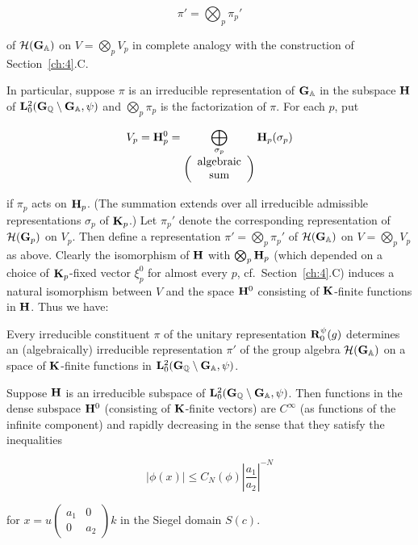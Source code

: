 \[
\pi' = \bigotimes_p \pi_p'
\]

of $\mathcal{H}(\mathbf{G}_{\mathbb{A}})$ on $V = \bigotimes_p V_p$ in complete analogy with the construction of Section~\ref{ch:4}.C.

In particular, suppose $\pi$ is an irreducible representation of $\mathbf{G}_{\mathbb{A}}$ in the subspace $\mathbf{H}$ of $\mathbf{L}_0^2(\mathbf{G}_{\mathbb{Q}} \setminus \mathbf{G}_{\mathbb{A}}, \psi)$ and $\bigotimes_p \pi_p$ is the factorization of $\pi$. For each $p$, put

\[
V_p = \mathbf{H}_p^0 = \bigoplus_{\substack{\sigma_p\\ \left(\begin{array}{c} \text{algebraic}\\ \text{sum} \end{array}\right)}} \mathbf{H}_p(\sigma_p)
\]

if $\pi_p$ acts on $\mathbf{H}_p$. (The summation extends over all irreducible admissible representations $\sigma_p$ of $\mathbf{K}_p$.) Let $\pi_p'$ denote the corresponding representation of $\mathcal{H}(\mathbf{G}_p)$ on $V_p$. Then define a representation $\pi' = \bigotimes_p \pi_p'$ of $\mathcal{H}(\mathbf{G}_{\mathbb{A}})$ on $V = \bigotimes_p V_p$ as above. Clearly the isomorphism of $\mathbf{H}$ with $\bigotimes_p \mathbf{H}_p$ (which depended on a choice of $\mathbf{K}_p$-fixed vector $\xi_p^0$ for almost every $p$, cf.\ Section~\ref{ch:4}.C) induces a natural isomorphism between $V$ and the space $\mathbf{H}^0$ consisting of $\mathbf{K}$-finite functions in $\mathbf{H}$. Thus we have:

\begin{lemma}\label{lem:5.5}

Every irreducible constituent $\pi$ of the unitary representation $\mathbf{R}_0^{\psi}(g)$ determines an (algebraically) irreducible representation $\pi'$ of the group algebra $\mathcal{H}(\mathbf{G}_{\mathbb{A}})$ on a space of $\mathbf{K}$-finite functions in $\mathbf{L}_0^2(\mathbf{G}_{\mathbb{Q}} \setminus \mathbf{G}_{\mathbb{A}}, \psi)$.

\end{lemma}

\begin{lemma}\label{lem:5.6}

Suppose $\mathbf{H}$ is an irreducible subspace of $\mathbf{L}_0^2(\mathbf{G}_{\mathbb{Q}} \setminus \mathbf{G}_{\mathbb{A}}, \psi)$. Then functions in the dense subspace $\mathbf{H}^0$ (consisting of $\mathbf{K}$-finite vectors) are $C^{\infty}$ (as functions of the infinite component) and rapidly decreasing in the sense that they satisfy the inequalities

\begin{equation}\label{eq:5.5}
|\phi(x)| \leq C_N(\phi) \left|\frac{a_1}{a_2}\right|^{-N}\tag{5.5}
\end{equation}

for $x = u \begin{pmatrix} a_1 & 0 \\ 0 & a_2 \end{pmatrix} k$ in the Siegel domain $S(c)$.

\end{lemma}

